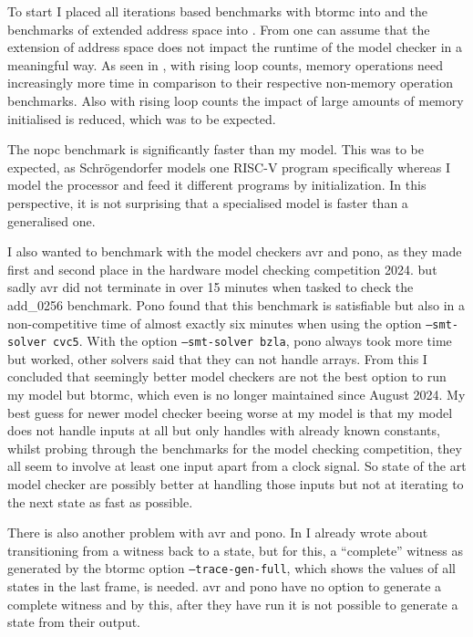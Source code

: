To start I placed all iterations based benchmarks with btormc into
 and the benchmarks of extended address space
into . From  one
can assume that the extension of address space does not impact the
runtime of the model checker in a meaningful way. As seen in
, with rising loop counts, memory operations
need increasingly more time in comparison to their respective
non-memory operation benchmarks. Also with rising loop counts the
impact of large amounts of memory initialised is reduced, which was
to be expected.

The nopc benchmark is significantly faster than my model. This was to
be expected, as Schrögendorfer models one RISC-V program specifically
whereas I model the processor and feed it different programs by
initialization. In this perspective, it is not surprising that a
specialised model is faster than a generalised one. 




I also wanted to benchmark with the model checkers avr and pono, as
they made first and second place in the hardware model checking
competition 2024. but sadly avr did not terminate in over 15 minutes
when tasked to check the add\_0256 benchmark. Pono found that this
benchmark is satisfiable but also in a non-competitive time of almost
exactly six minutes when using the option \texttt{--smt-solver cvc5}.
With the option \texttt{--smt-solver bzla}, pono always took more
time but worked, other solvers said that they can not handle arrays.
From this I concluded that seemingly better model checkers are not
the best option to run my model but btormc, which even is no longer
maintained since August 2024. My best guess for newer model checker
beeing worse at my model is that my model does not handle inputs at
all but only handles with already known constants, whilst probing
through the benchmarks for the model checking competition, they all
seem to involve at least one input apart from a clock signal. So
state of the art model checker are possibly better at handling those
inputs but not at iterating to the next state as fast as possible.

There is also another problem with avr and pono. In
 I already wrote about transitioning from a
witness back to a state, but for this, a \enquote{complete} witness
as generated by the btormc option \texttt{--trace-gen-full}, which
shows the values of all states in the last frame, is needed. avr and
pono have no option to generate a complete witness and by this, after
they have run it is not possible to generate a state from their
output.
%